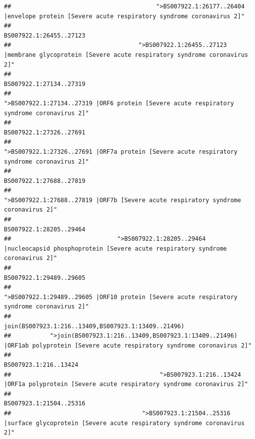 \documentclass[
]{article}
\begin{document}
\begin{verbatim}
##                                         ">BS007922.1:26177..26404 |envelope protein [Severe acute respiratory syndrome coronavirus 2]" 
##                                                                                                                BS007922.1:26455..27123 
##                                    ">BS007922.1:26455..27123 |membrane glycoprotein [Severe acute respiratory syndrome coronavirus 2]" 
##                                                                                                                BS007922.1:27134..27319 
##                                             ">BS007922.1:27134..27319 |ORF6 protein [Severe acute respiratory syndrome coronavirus 2]" 
##                                                                                                                BS007922.1:27326..27691 
##                                            ">BS007922.1:27326..27691 |ORF7a protein [Severe acute respiratory syndrome coronavirus 2]" 
##                                                                                                                BS007922.1:27688..27819 
##                                                    ">BS007922.1:27688..27819 |ORF7b [Severe acute respiratory syndrome coronavirus 2]" 
##                                                                                                                BS007922.1:28205..29464 
##                              ">BS007922.1:28205..29464 |nucleocapsid phosphoprotein [Severe acute respiratory syndrome coronavirus 2]" 
##                                                                                                                BS007922.1:29489..29605 
##                                            ">BS007922.1:29489..29605 |ORF10 protein [Severe acute respiratory syndrome coronavirus 2]" 
##                                                                                    join(BS007923.1:216..13409,BS007923.1:13409..21496) 
##           ">join(BS007923.1:216..13409,BS007923.1:13409..21496) |ORF1ab polyprotein [Severe acute respiratory syndrome coronavirus 2]" 
##                                                                                                                  BS007923.1:216..13424 
##                                          ">BS007923.1:216..13424 |ORF1a polyprotein [Severe acute respiratory syndrome coronavirus 2]" 
##                                                                                                                BS007923.1:21504..25316 
##                                     ">BS007923.1:21504..25316 |surface glycoprotein [Severe acute respiratory syndrome coronavirus 2]" 

\end{verbatim}
\end{document}
